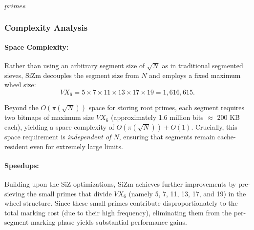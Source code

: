 \documentclass{article}
\begin{document}
\begin{algorithm}[H]
\begin{algorithmic}[1]
                \State {}   
                     
                        \State {}
                    \EndIf

                     
                        \State {}
                    \EndIf
                \EndFor
            \EndFor

            \State {}
            \State \Return $primes$
        \EndProcedure
    \end{algorithmic}
\end{algorithm}

\subsubsection*{Complexity Analysis}

\paragraph{Space Complexity:} 
Rather than using an arbitrary segment size of $\sqrt{N}$ as in traditional segmented sieves, SiZm decouples the segment size from $N$ and employs a fixed maximum wheel size:
$$VX_6 = 5 \times 7 \times 11 \times 13 \times 17 \times 19 = 1{,}616{,}615.$$

Beyond the $O(\pi(\sqrt{N}))$ space for storing root primes, each segment requires two bitmaps of maximum size $VX_6$ (approximately 1.6 million bits $\approx$ 200 KB each), yielding a space complexity of $O(\pi(\sqrt{N})) + O(1)$. Crucially, this space requirement is \emph{independent of $N$}, ensuring that segments remain cache-resident even for extremely large limits.

\paragraph{Speedups:} 
Building upon the SiZ optimizations, SiZm achieves further improvements by pre-sieving the small primes that divide $VX_6$ (namely 5, 7, 11, 13, 17, and 19) in the wheel structure. Since these small primes contribute disproportionately to the total marking cost (due to their high frequency), eliminating them from the per-segment marking phase yields substantial performance gains.
\end{document}
